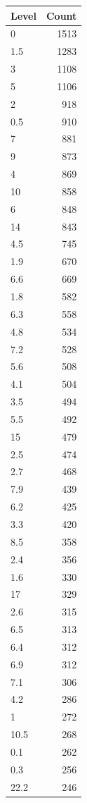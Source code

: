 \begin{table}[ht]
\centering
\begin{tabular}{lr}
  \hline
Level & Count \\ 
  \hline
0 & 1513 \\ 
  1.5 & 1283 \\ 
  3 & 1108 \\ 
  5 & 1106 \\ 
  2 & 918 \\ 
  0.5 & 910 \\ 
  7 & 881 \\ 
  9 & 873 \\ 
  4 & 869 \\ 
  10 & 858 \\ 
  6 & 848 \\ 
  14 & 843 \\ 
  4.5 & 745 \\ 
  1.9 & 670 \\ 
  6.6 & 669 \\ 
  1.8 & 582 \\ 
  6.3 & 558 \\ 
  4.8 & 534 \\ 
  7.2 & 528 \\ 
  5.6 & 508 \\ 
  4.1 & 504 \\ 
  3.5 & 494 \\ 
  5.5 & 492 \\ 
  15 & 479 \\ 
  2.5 & 474 \\ 
  2.7 & 468 \\ 
  7.9 & 439 \\ 
  6.2 & 425 \\ 
  3.3 & 420 \\ 
  8.5 & 358 \\ 
  2.4 & 356 \\ 
  1.6 & 330 \\ 
  17 & 329 \\ 
  2.6 & 315 \\ 
  6.5 & 313 \\ 
  6.4 & 312 \\ 
  6.9 & 312 \\ 
  7.1 & 306 \\ 
  4.2 & 286 \\ 
  1 & 272 \\ 
  10.5 & 268 \\ 
  0.1 & 262 \\ 
  0.3 & 256 \\ 
  22.2 & 246 \\ 

\end{tabular}
\end{table}
